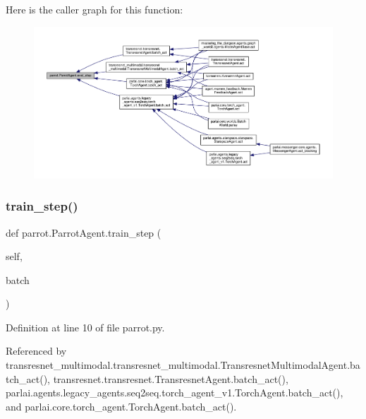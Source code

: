 Here is the caller graph for this function\+:
\nopagebreak
\begin{figure}[H]
\begin{center}
\leavevmode
\includegraphics[width=350pt]{classparrot_1_1ParrotAgent_a210ad5eb90ce7add4a2b2cb641c4de3c_icgraph}
\end{center}
\end{figure}
\mbox{\label{classparrot_1_1ParrotAgent_a85446c6c7698b050d80a2324495c9321}} 
\subsubsection{\texorpdfstring{train\+\_\+step()}{train\_step()}}
{\footnotesize\ttfamily def parrot.\+Parrot\+Agent.\+train\+\_\+step (\begin{DoxyParamCaption}\item[{}]{self,  }\item[{}]{batch }\end{DoxyParamCaption})}



Definition at line 10 of file parrot.\+py.



Referenced by transresnet\+\_\+multimodal.\+transresnet\+\_\+multimodal.\+Transresnet\+Multimodal\+Agent.\+batch\+\_\+act(), transresnet.\+transresnet.\+Transresnet\+Agent.\+batch\+\_\+act(), parlai.\+agents.\+legacy\+\_\+agents.\+seq2seq.\+torch\+\_\+agent\+\_\+v1.\+Torch\+Agent.\+batch\+\_\+act(), and parlai.\+core.\+torch\+\_\+agent.\+Torch\+Agent.\+batch\+\_\+act().


